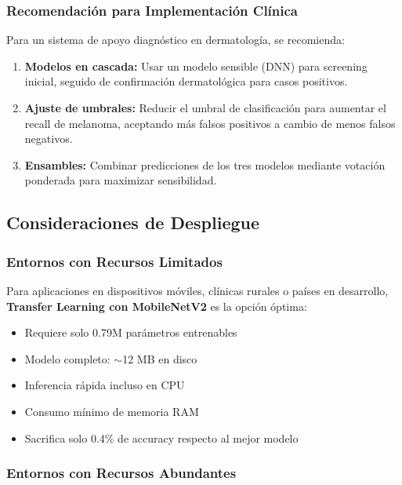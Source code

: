 \documentclass[11pt, a4paper]{article}
\begin{document}
\subsubsection{Recomendación para Implementación Clínica}

Para un sistema de apoyo diagnóstico en dermatología, se recomienda:

\begin{enumerate}
    \item \textbf{Modelos en cascada:} Usar un modelo sensible (DNN) para screening inicial, seguido de confirmación dermatológica para casos positivos.
    
    \item \textbf{Ajuste de umbrales:} Reducir el umbral de clasificación para aumentar el recall de melanoma, aceptando más falsos positivos a cambio de menos falsos negativos.
    
    \item \textbf{Ensambles:} Combinar predicciones de los tres modelos mediante votación ponderada para maximizar sensibilidad.
\end{enumerate}

\subsection{Consideraciones de Despliegue}

\subsubsection{Entornos con Recursos Limitados}

Para aplicaciones en dispositivos móviles, clínicas rurales o países en desarrollo, \textbf{Transfer Learning con MobileNetV2} es la opción óptima:

\begin{itemize}
    \item Requiere solo 0.79M parámetros entrenables
    \item Modelo completo: $\sim$12 MB en disco
    \item Inferencia rápida incluso en CPU
    \item Consumo mínimo de memoria RAM
    \item Sacrifica solo 0.4\% de accuracy respecto al mejor modelo
\end{itemize}

\subsubsection{Entornos con Recursos Abundantes}
\end{document}
